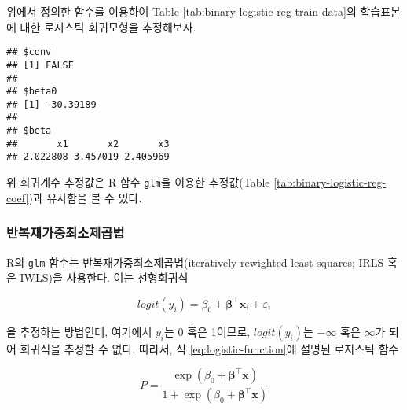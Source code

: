 \documentclass[
]{book}
\newenvironment{Shaded}{\begin{snugshade}}{\end{snugshade}}
\newcommand{\AttributeTok}[1]{\textcolor[rgb]{0.77,0.63,0.00}{#1}}
\newcommand{\DecValTok}[1]{\textcolor[rgb]{0.00,0.00,0.81}{#1}}
\newcommand{\FloatTok}[1]{\textcolor[rgb]{0.00,0.00,0.81}{#1}}
\newcommand{\FunctionTok}[1]{\textcolor[rgb]{0.00,0.00,0.00}{#1}}
\newcommand{\NormalTok}[1]{#1}
\newcommand{\OtherTok}[1]{\textcolor[rgb]{0.56,0.35,0.01}{#1}}
\newcommand{\SpecialCharTok}[1]{\textcolor[rgb]{0.00,0.00,0.00}{#1}}
\newcommand{\StringTok}[1]{\textcolor[rgb]{0.31,0.60,0.02}{#1}}
\begin{document}
위에서 정의한 함수를 이용하여 Table \ref{tab:binary-logistic-reg-train-data}의 학습표본에 대한 로지스틱 회귀모형을 추정해보자.

\begin{Shaded}
\end{Shaded}

\begin{verbatim}
## $conv
## [1] FALSE
## 
## $beta0
## [1] -30.39189
## 
## $beta
##       x1       x2       x3 
## 2.022808 3.457019 2.405969
\end{verbatim}

위 회귀계수 추정값은 R 함수 \texttt{glm}을 이용한 추정값(Table \ref{tab:binary-logistic-reg-coef})과 유사함을 볼 수 있다.

\hypertarget{binary-logistic-irls}{%
\subsubsection{반복재가중최소제곱법}\label{binary-logistic-irls}}

R의 \texttt{glm} 함수는 반복재가중최소제곱법(iteratively rewighted least squares; IRLS 혹은 IWLS)을 사용한다. 이는 선형회귀식

\begin{equation*}
logit(y_i) = \beta_0 + \boldsymbol\beta^\top \mathbf{x}_i + \varepsilon_i
\end{equation*}

을 추정하는 방법인데, 여기에서 \(y_i\)는 0 혹은 1이므로, \(logit(y_i)\)는 \(-\infty\) 혹은 \(\infty\)가 되어 회귀식을 추정할 수 없다. 따라서, 식 \eqref{eq:logistic-function}에 설명된 로지스틱 함수

\begin{equation*}
P = \frac{\exp(\beta_0 + \boldsymbol\beta^\top \mathbf{x})}{1 + \exp(\beta_0 + \boldsymbol\beta^\top \mathbf{x})}
\end{equation*}
\end{document}
